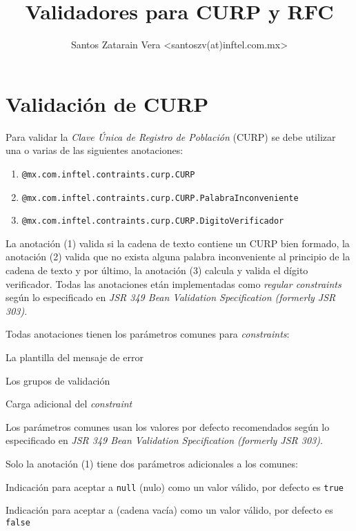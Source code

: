 \documentclass[12pt,letterpaper]{article}
\begin{document}
\title{Validadores para CURP y RFC}
\author{Santos Zatarain Vera <santoszv(at)inftel.com.mx>}

\maketitle

\tableofcontents

\section{Validación de CURP}

Para validar la \emph{Clave Única de Registro de Población} (CURP) se debe utilizar una o varias de
las siguientes anotaciones:

\begin{enumerate}[noitemsep]
\item \texttt{@mx.com.inftel.contraints.curp.CURP}
\item \texttt{@mx.com.inftel.contraints.curp.CURP.PalabraInconveniente}
\item \texttt{@mx.com.inftel.contraints.curp.CURP.DigitoVerificador}
\end{enumerate}

La anotación (1) valida si la cadena de texto contiene un CURP bien formado, la anotación (2) valida que no exista
alguna palabra inconveniente al principio de la cadena de texto y por último, la anotación (3) calcula y valida
el dígito verificador. Todas las anotaciones etán implementadas como \emph{regular constraints} según lo especificado
en \emph{JSR 349 Bean Validation Specification (formerly JSR 303)}.

Todas anotaciones tienen los parámetros comunes para \emph{constraints}:

\begin{description}[noitemsep]
\item[message] La plantilla del mensaje de error
\item[groups] Los grupos de validación
\item[payload] Carga adicional del \emph{constraint}
\end{description}

Los parámetros comunes usan los valores por defecto recomendados según lo especificado en \emph{JSR 349 Bean
Validation Specification (formerly JSR 303)}.

Solo la anotación (1) tiene dos parámetros adicionales a los comunes:

\begin{description}[noitemsep]
\item[isNullValueValid] Indicación para aceptar a \texttt{null} (nulo) como un valor válido, por defecto
    es \texttt{true}
\item[isEmptyValueValid] Indicación para aceptar a \texttt{\textquotedbl\textquotedbl} (cadena vacía) como un valor
    válido, por defecto es \texttt{false}
\end{description}
\end{document}
